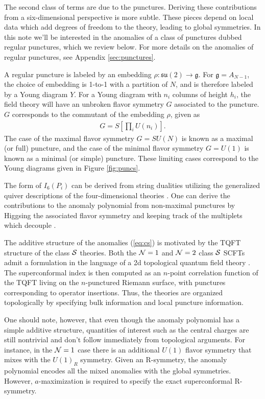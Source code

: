 \documentclass[a4paper,11pt]{article}
\newcommand{\ba}[1]{\begin{align} #1 \end{align} }
\def\CN{{\cal N}}
\def\CS{{\cal S}}
\begin{document}
The second class of terms are due to the punctures. Deriving these contributions from a six-dimensional perspective is more subtle. These pieces depend on local data which add degrees of freedom to the theory, leading to global symmetries. In this note we'll be interested in the anomalies of a class of punctures dubbed regular punctures, which we review below. For more details on the anomalies of regular punctures, see Appendix \ref{sec:punctures}.

A regular puncture is labeled by an embedding $\rho: \mathfrak{su}(2)\to \mathfrak{g}$. For $\mathfrak{g}=A_{N-1}$, the choice of embedding is 1-to-1 with a partition of $N$, and is therefore labeled by a Young diagram $Y$. For a Young diagram with $n_i$ columns of height $h_i$, the field theory will have an unbroken flavor symmetry $G$ associated to the puncture. $G$ corresponds to the commutant of the embedding $\rho$, given as
	\ba{
	G=S\left[\prod_i U(n_i)\right]. \label{eq:flavorp}
	}
The case of the maximal flavor symmetry $G=SU(N)$ is known as a maximal (or full) puncture, and the case of the minimal flavor symmetry $G=U(1)$ is known as a minimal (or simple) puncture. These limiting cases correspond to the Young diagrams given in Figure \ref{fig:puncs}.


The form of $I_6(P_i)$ can be derived from string dualities utilizing the generalized quiver descriptions of the four-dimensional theories \cite{Chacaltana:2012zy}.  One can derive the contributions to the anomaly polynomial from non-maximal punctures by Higgsing the associated flavor symmetry and keeping track of the multiplets which decouple \cite{Tachikawa:2015bga}. 



The additive structure of the anomalies (\ref{eq:cs}) is motivated by the TQFT structure of the class $\CS$ theories. Both the $\CN=1$ and $\CN=2$ class $\CS$ SCFTs admit a formulation in the language of a 2d topological quantum field theory \cite{Gadde:2009kb,Gadde:2011uv,Gadde:2011ik,Gaiotto:2012xa,Beem:2012yn}. The superconformal index is then computed as an $n$-point correlation function of the TQFT living on the $n$-punctured Riemann surface, with punctures corresponding to operator insertions. Thus, the theories are organized topologically by specifying bulk information and local puncture information. 

One should note, however, that even though the anomaly polynomial has a simple additive structure, quantities of interest such as the central charges are still nontrivial and don't follow immediately from topological arguments. For instance, in the $\CN=1$ case there is an additional $U(1)$ flavor symmetry that mixes with the $U(1)_R$ symmetry. Given an R-symmetry, the anomaly polynomial encodes all the mixed anomalies with the global symmetries. However, $a$-maximization is required to specify the exact superconformal R-symmetry. 
\end{document}

